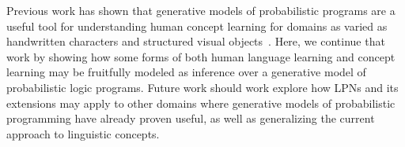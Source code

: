 \documentclass[11pt, twocolumn]{article}
\begin{document}
Previous work has shown that generative models of probabilistic
programs are a useful tool for understanding human concept learning
for domains as varied as handwritten characters and structured visual
objects~\cite{dechter2013bootstrap, Stuhlmuller, BrendensPaper}. Here,
we continue that work by showing how some forms of both human language
learning and concept learning may be fruitfully modeled as inference
over a generative model of probabilistic logic programs. Future work
should work explore how LPNs and its extensions may apply to other
domains where generative models of probabilistic programming have
already proven useful, as well as generalizing the current approach to
linguistic concepts.




\nocite{*}
\end{document}
